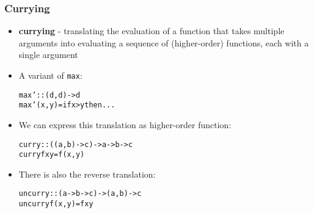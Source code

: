 \documentclass[final,handout]{beamer}
\begin{document}
\begin{frame}[fragile]
    \frametitle{Currying}

    \begin{itemize}
        \item<1-> \textbf{currying} - translating the evaluation of a function that
            takes multiple arguments  into
            evaluating a sequence of (higher-order) functions, each with a single 
            argument
        \item<2-> A variant of \texttt{max}:
            \begin{alltt}
    max' :: (d, d) -> d
    max' (x, y) = if x > y then ...
            \end{alltt}

        \item<4-> We can express this translation as higher-order function:
            \begin{alltt}
    curry :: ((a, b) -> c) -> a -> b -> c
    curry f x y = f (x, y)
            \end{alltt}
            
        \item<5->There is also the reverse translation:
            \begin{alltt}
    uncurry :: (a -> b -> c) -> (a, b) -> c
    uncurry f (x, y) = f x y
            \end{alltt}
    \end{itemize}
\end{frame}
\end{document}
